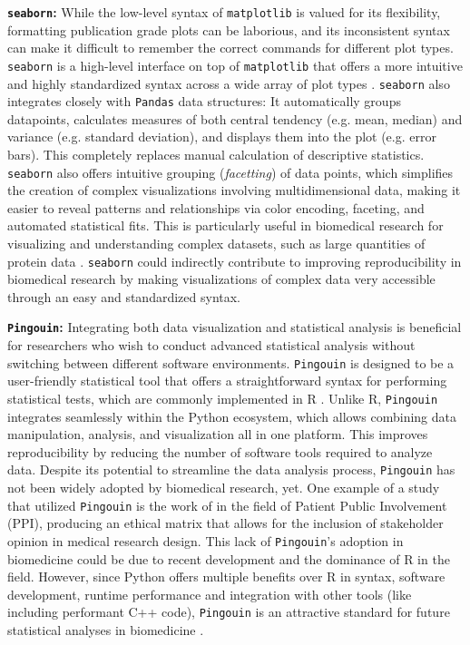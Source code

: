 \textbf{\texttt{seaborn}:} While the low-level syntax of \texttt{matplotlib} is
valued for its flexibility, formatting publication grade plots can be laborious,
and its inconsistent syntax can make it difficult to remember the correct
commands for different plot types. \texttt{seaborn} is a high-level interface on
top of \texttt{matplotlib} that offers a more intuitive and highly standardized
syntax across a wide array of plot types
\cite{waskomSeabornStatisticalData2021}. \texttt{seaborn} also integrates
closely with \texttt{Pandas} data structures: It automatically groups
datapoints, calculates measures of both central tendency (e.g. mean, median) and
variance (e.g. standard deviation), and displays them into the plot (e.g. error
bars). This completely replaces manual calculation of descriptive statistics.
\texttt{seaborn} also offers intuitive grouping (\textit{facetting}) of data
points, which simplifies the creation of complex visualizations involving
multidimensional data, making it easier to reveal patterns and relationships via
color encoding, faceting, and automated statistical fits. This is particularly
useful in biomedical research for visualizing and understanding complex
datasets, such as large quantities of protein data
\cite{krzywinskiMultidimensionalData2013,weissVisualizingProteinBig2022}.
\texttt{seaborn} could indirectly contribute to improving reproducibility in
biomedical research by making visualizations of complex data very accessible
through an easy and standardized syntax.



\textbf{\texttt{Pingouin}:} Integrating both data visualization and statistical
analysis is beneficial for researchers who wish to conduct advanced statistical
analysis without switching between different software environments.
\texttt{Pingouin} is designed to be a user-friendly statistical tool that offers
a straightforward syntax for performing statistical tests, which are commonly
implemented in R \cite{vallatPingouinStatisticsPython2018}. Unlike R,
\texttt{Pingouin} integrates seamlessly within the Python ecosystem, which
allows combining data manipulation, analysis, and visualization all in one
platform. This improves reproducibility by reducing the number of software tools
required to analyze data. Despite its potential to streamline the data analysis
process, \texttt{Pingouin} has not been widely adopted by biomedical research,
yet. One example of a study that utilized \texttt{Pingouin} is the work of
\citet{kellyEthicalMatrixMethod2023} in the field of Patient Public Involvement
(PPI), producing an ethical matrix that allows for the inclusion of stakeholder
opinion in medical research design. This lack of \texttt{Pingouin}'s adoption in
biomedicine could be due to recent development and the dominance of R in the
field. However, since Python offers multiple benefits over R in syntax, software
development, runtime performance and integration with other tools (like
including performant C++ code), \texttt{Pingouin} is an attractive standard for
future statistical analyses in biomedicine
\cite{gorelickHighPerformancePython2020}.



